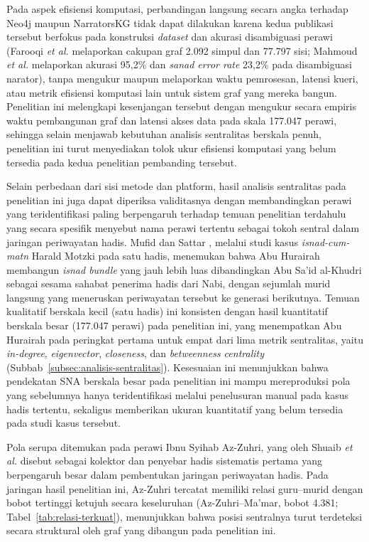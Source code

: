Pada aspek efisiensi komputasi, perbandingan langsung secara angka terhadap Neo4j \cite{FAROOQI2024110439} maupun NarratorsKG \cite{Mahmoud2024} tidak dapat dilakukan karena kedua publikasi tersebut berfokus pada konstruksi \textit{dataset} dan akurasi disambiguasi perawi (Farooqi \textit{et al.} melaporkan cakupan graf 2.092 simpul dan 77.797 sisi; Mahmoud \textit{et al.} melaporkan akurasi 95,2\% dan \textit{sanad error rate} 23,2\% pada disambiguasi narator), tanpa mengukur maupun melaporkan waktu pemrosesan, latensi kueri, atau metrik efisiensi komputasi lain untuk sistem graf yang mereka bangun. Penelitian ini melengkapi kesenjangan tersebut dengan mengukur secara empiris waktu pembangunan graf dan latensi akses data pada skala 177.047 perawi, sehingga selain menjawab kebutuhan analisis sentralitas berskala penuh, penelitian ini turut menyediakan tolok ukur efisiensi komputasi yang belum tersedia pada kedua penelitian pembanding tersebut.

Selain perbedaan dari sisi metode dan platform, hasil analisis sentralitas pada penelitian ini juga dapat diperiksa validitasnya dengan membandingkan perawi yang teridentifikasi paling berpengaruh terhadap temuan penelitian terdahulu yang secara spesifik menyebut nama perawi tertentu sebagai tokoh sentral dalam jaringan periwayatan hadis. Mufid dan Sattar \cite{mufid2023track}, melalui studi kasus \textit{isnad-cum-matn} Harald Motzki pada satu hadis, menemukan bahwa Abu Hurairah membangun \textit{isnad bundle} yang jauh lebih luas dibandingkan Abu Sa'id al-Khudri sebagai sesama sahabat penerima hadis dari Nabi, dengan sejumlah murid langsung yang meneruskan periwayatan tersebut ke generasi berikutnya. Temuan kualitatif berskala kecil (satu hadis) ini konsisten dengan hasil kuantitatif berskala besar (177.047 perawi) pada penelitian ini, yang menempatkan Abu Hurairah pada peringkat pertama untuk empat dari lima metrik sentralitas, yaitu \textit{in-degree}, \textit{eigenvector}, \textit{closeness}, dan \textit{betweenness centrality} (Subbab~\ref{subsec:analisis-sentralitas}). Kesesuaian ini menunjukkan bahwa pendekatan SNA berskala besar pada penelitian ini mampu mereproduksi pola yang sebelumnya hanya teridentifikasi melalui penelusuran manual pada kasus hadis tertentu, sekaligus memberikan ukuran kuantitatif yang belum tersedia pada studi kasus tersebut.

Pola serupa ditemukan pada perawi Ibnu Syihab Az-Zuhri, yang oleh Shuaib \textit{et al.} \cite{Shuaib2022} disebut sebagai kolektor dan penyebar hadis sistematis pertama yang berpengaruh besar dalam pembentukan jaringan periwayatan hadis. Pada jaringan hasil penelitian ini, Az-Zuhri tercatat memiliki relasi guru--murid dengan bobot tertinggi ketujuh secara keseluruhan (Az-Zuhri--Ma'mar, bobot 4.381; Tabel~\ref{tab:relasi-terkuat}), menunjukkan bahwa posisi sentralnya turut terdeteksi secara struktural oleh graf yang dibangun pada penelitian ini.

